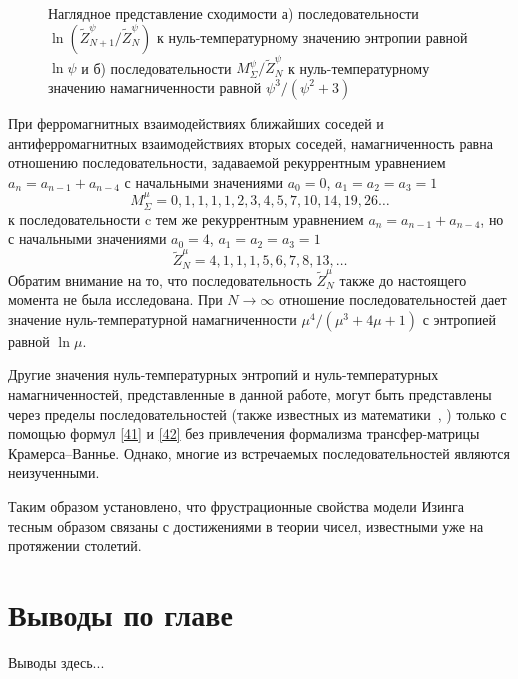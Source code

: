  \begin{figure}[h]
 	\begin{minipage}{0.49\linewidth}
 	\end{minipage}
 	\hfill
 	\begin{minipage}{0.49\linewidth}
 	\end{minipage}
 	\caption{Наглядное представление сходимости а) последовательности $\ln (\widetilde{Z}_{N+1}^{\psi}/\widetilde{Z}_{N}^{\psi})$ к нуль-температурному значению энтропии равной $\ln \psi$ и б) последовательности $M_{\Sigma}^{\psi}/\widetilde{Z}_{N}^{\psi}$ к нуль-температурному значению намагниченности равной $\psi^3/(\psi^2+3)$}
 	\label{fr2}
 \end{figure}

При ферромагнитных взаимодействиях ближайших соседей и антиферромагнитных взаимодействиях вторых соседей, намагниченность равна отношению последовательности, задаваемой рекуррентным уравнением $a_n = a_{n-1} + a_{n-4}$ с начальными значениями $a_0 = 0$, $a_1 = a_2 = a_3 = 1$ \[M^{\mu}_{\Sigma} = 0, 1, 1, 1, 1, 2, 3, 4, 5, 7, 10, 14, 19, 26 \dots\] к последовательности c тем же рекуррентным уравнением $a_n = a_{n-1} + a_{n-4}$, но с начальными значениями $a_0 = 4$, $a_1 = a_2 = a_3 = 1$ \[\widetilde{Z}^{\mu}_{N} = 4, 1, 1, 1, 5, 6, 7, 8, 13, \dots\] Обратим внимание на то, что последовательность $\widetilde{Z}^{\mu}_{N}$ также до настоящего момента не была исследована.
При $N\rightarrow \infty$ отношение последовательностей дает значение нуль-температурной намагниченности $\mu^4/(\mu^3+4\mu+1)$ с энтропией равной $\ln \mu$.

Другие значения нуль-температурных энтропий и нуль-температурных намагниченностей, представленные в данной работе, могут быть представлены через пределы последовательностей (также известных из математики~\cite{sloane1973, sloane1995}, \cite{bicknell1975, vieira2020, adams1982}) только с помощью формул \eqref{41} и \eqref{42} без привлечения формализма трансфер-матрицы Крамерса--Ваннье. Однако, многие из встречаемых последовательностей являются неизученными.

Таким образом установлено, что фрустрационные свойства модели Изинга тесным образом связаны с достижениями в теории чисел, известными уже на протяжении столетий.

\section{Выводы по главе}

Выводы здесь...

\FloatBarrier